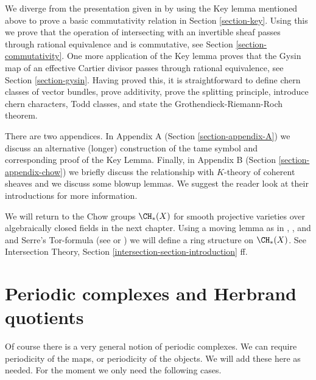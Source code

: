 \medskip\noindent
We diverge from the presentation given in \cite{F} by using the
Key lemma mentioned above to prove a basic commutativity relation in
Section \ref{section-key}. Using this we prove that the operation
of intersecting with an invertible sheaf passes through rational
equivalence and is commutative, see Section \ref{section-commutativity}.
One more application of the Key
lemma proves that the Gysin map of an effective Cartier divisor
passes through rational equivalence, see Section \ref{section-gysin}.
Having proved this, it is straightforward to define chern
classes of vector bundles, prove additivity, prove the splitting principle,
introduce chern characters, Todd classes, and state the
Grothendieck-Riemann-Roch theorem.

\medskip\noindent
There are two appendices. In Appendix A (Section \ref{section-appendix-A})
we discuss an alternative (longer) construction of the
tame symbol and corresponding proof of the Key Lemma.
Finally, in Appendix B (Section \ref{section-appendix-chow})
we briefly discuss the relationship with $K$-theory of coherent
sheaves and we discuss some blowup lemmas.
We suggest the reader look at their introductions for
more information.

\medskip\noindent
We will return to the Chow groups $\CH_*(X)$ for smooth projective varieties
over algebraically closed fields in the next chapter. Using a moving
lemma as in \cite{Samuel}, \cite{ChevalleyI}, and \cite{ChevalleyII}
and Serre's Tor-formula
(see \cite{Serre_local_algebra} or \cite{Serre_algebre_locale})
we will define a ring structure on $\CH_*(X)$. See
Intersection Theory, Section \ref{intersection-section-introduction} ff.








\section{Periodic complexes and Herbrand quotients}
\label{section-periodic-complexes}

\noindent
Of course there is a very general notion of periodic complexes.
We can require periodicity of the maps, or periodicity of the objects.
We will add these here as needed. For the moment we only need
the following cases.

